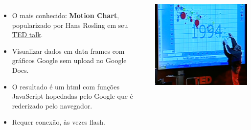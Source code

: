 \begin{frame}

  \begin{columns}
    \begin{itemize}
    \item O mais conhecido: \textbf{Motion Chart}, popularizado por Hans
      Rosling em seu
      \href{https://www.ted.com/talks/hans_rosling_shows_the_best_stats_you_ve_ever_seen}{TED
        talk}.
    \item Visualizar dados em data frames com gráficos Google sem upload
      no Google Docs.
    \item O resultado é um html com funções JavaScript hopedadas pelo
      Google que é rederizado pelo navegador.
    \item Requer conexão, às vezes flash.
    \end{itemize}

    \includegraphics[width=\linewidth]{./images/ted-hans-hosling.png}
  \end{columns}

\end{frame}

